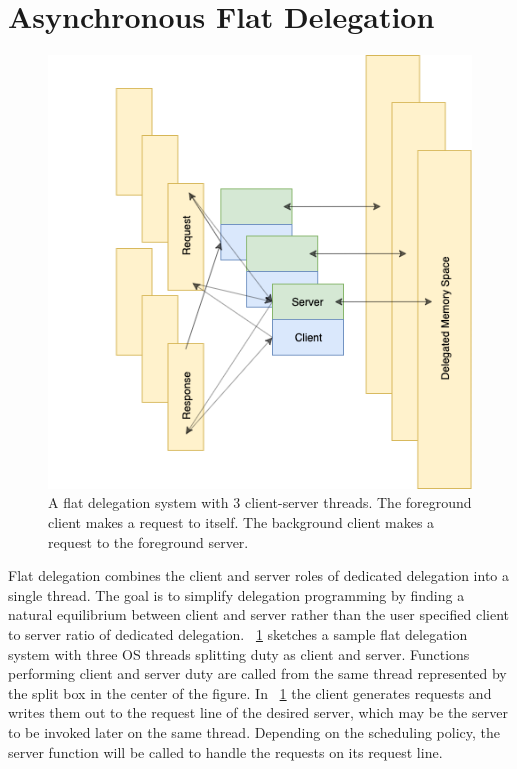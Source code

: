 \documentclass{uicthesi}
\begin{document}
\section{Asynchronous Flat Delegation}
\begin{figure}[ht!]
\centering
\includegraphics[width=0.9\columnwidth]{FIG/flat_async.png}
\caption{A flat delegation system with 3 client-server threads. The foreground client makes a request to itself. The background client makes a request to the foreground server. }
\label{fig:flat_delegation}
\end{figure}

Flat delegation combines the client and server roles of dedicated delegation into a single thread. The goal is to simplify delegation programming by finding a natural equilibrium between client and server rather than the user specified client to server ratio of dedicated delegation. ~\ref{fig:flat_delegation} sketches a sample flat delegation system with three OS threads splitting duty as client and server. Functions performing client and server duty are called from the same thread represented by the split box in the center of the figure. In ~\ref{fig:flat_delegation} the client generates requests and writes them out to the request line of the desired server, which may be the server to be invoked later on the same thread. Depending on the scheduling policy, the server function will be called to handle the requests on its request line. 
\end{document}
